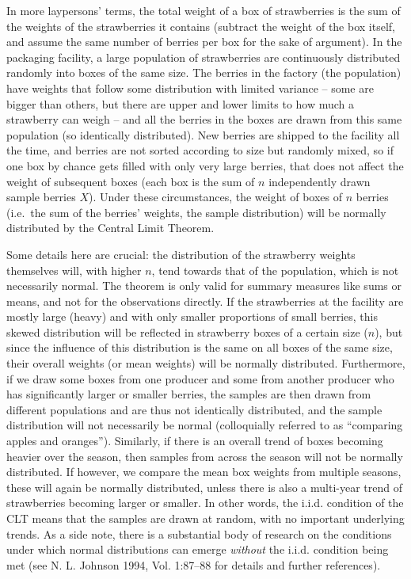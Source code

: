 \documentclass[
  12pt,
  a4paper, twoside]{book}
\begin{document}
In more laypersons' terms, the total weight of a box of strawberries is the sum of the weights of the strawberries it contains (subtract the weight of the box itself, and assume the same number of berries per box for the sake of argument). In the packaging facility, a large population of strawberries are continuously distributed randomly into boxes of the same size. The berries in the factory (the population) have weights that follow some distribution with limited variance -- some are bigger than others, but there are upper and lower limits to how much a strawberry can weigh -- and all the berries in the boxes are drawn from this same population (so identically distributed). New berries are shipped to the facility all the time, and berries are not sorted according to size but randomly mixed, so if one box by chance gets filled with only very large berries, that does not affect the weight of subsequent boxes (each box is the sum of \(n\) independently drawn sample berries \(X\)). Under these circumstances, the weight of boxes of \(n\) berries (i.e.~the sum of the berries' weights, the sample distribution) will be normally distributed by the Central Limit Theorem.

Some details here are crucial: the distribution of the strawberry weights themselves will, with higher \(n\), tend towards that of the population, which is not necessarily normal. The theorem is only valid for summary measures like sums or means, and not for the observations directly. If the strawberries at the facility are mostly large (heavy) and with only smaller proportions of small berries, this skewed distribution will be reflected in strawberry boxes of a certain size (\(n\)), but since the influence of this distribution is the same on all boxes of the same size, their overall weights (or mean weights) will be normally distributed. Furthermore, if we draw some boxes from one producer and some from another producer who has significantly larger or smaller berries, the samples are then drawn from different populations and are thus not identically distributed, and the sample distribution will not necessarily be normal (colloquially referred to as ``comparing apples and oranges''). Similarly, if there is an overall trend of boxes becoming heavier over the season, then samples from across the season will not be normally distributed. If however, we compare the mean box weights from multiple seasons, these will again be normally distributed, unless there is also a multi-year trend of strawberries becoming larger or smaller. In other words, the i.i.d. condition of the CLT means that the samples are drawn at random, with no important underlying trends. As a side note, there is a substantial body of research on the conditions under which normal distributions can emerge \emph{without} the i.i.d. condition being met (see N. L. Johnson 1994, Vol. 1:87--88 for details and further references).
\end{document}
